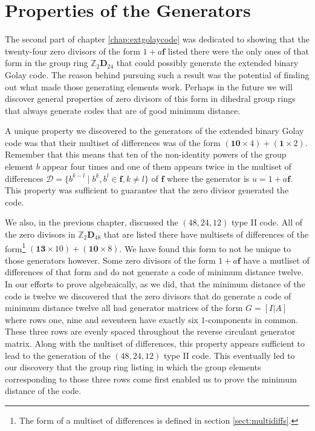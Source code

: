\section{Properties of the Generators}
\label{sect:genproperties}
The second part of chapter \ref{chap:extgolaycode} was dedicated to showing that the twenty-four zero divisors of the form $1+ a \mathbf{f}$ listed there were the only ones of that form in the group ring $\mathbb{Z}_2 \mathbf{D}_{24}$ that could possibly generate the extended binary Golay code.
The reason behind pursuing such a result was the potential of finding out what made those generating elements work.
Perhaps in the future we will discover general properties of zero divisors of this form in dihedral group rings that always generate codes that are of good minimum distance.

A unique property we discovered to the generators of the extended binary Golay code was that their multiset of differences was of the form $(\mathbf{10} \times 4) + (\mathbf{1} \times 2)$.
Remember that this means that ten of the non-identity powers of the group element $b$ appear four times and one of them appears twice in the multiset of differences $\mathcal{D} = \{ b^{k-l} \mid b^k , b^l \in \mathbf{f} , k \neq l \}$ of $\mathbf{f}$ where the generator is $u = 1 + a \mathbf{f}$.
This property was sufficient to guarantee that the zero divisor generated the code.

We also, in the previous chapter, discussed the $(48,24,12)$ type II code.
All of the zero divisors in $\mathbb{Z}_2 \mathbf{D}_{48}$ that are listed there have multisets of differences of the form\footnote{The form of a multiset of differences is defined in section \ref{sect:multidiffs}.} $( \mathbf{13} \times 10 ) + ( \mathbf{10} \times 8)$.
We have found this form to not be unique to those generators however.
Some zero divisors of the form $1 + a \mathbf{f}$ have a mutliset of differences of that form and do not generate a code of minimum distance twelve.
In our efforts to prove algebraically, as we did, that the minimum distance of the code is twelve we discovered that the zero divisors that do generate a code of minimum distance twelve all had generator matrices of the form $G = [I|A]$ where rows one, nine and seventeen have exactly six $1$-components in common.
These three rows are evenly spaced throughout the reverse circulant generator matrix.
Along with the multiset of differences, this property appears sufficient to lead to the generation of the $(48,24,12)$ type II code.
This eventually led to our discovery that the group ring listing in which the group elements corresponding to those three rows come first enabled us to prove the minimum distance of the code.

